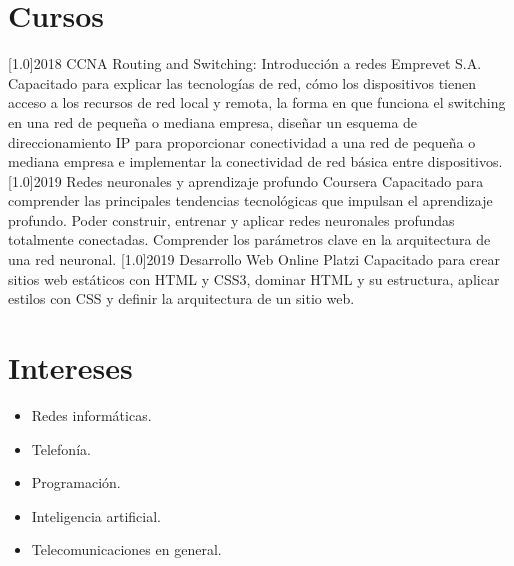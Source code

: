 \documentclass[espanol]{cv-style}     %
\begin{document}
\section{Cursos}
  \vspace{-0.2cm}
\begin{entrylist}
\entry
{\scalebox{.8}[1.0]{2018}}
{CCNA Routing and Switching: Introducción a redes}
{Emprevet S.A.}
{Capacitado para explicar las tecnologías de red, cómo los dispositivos tienen acceso a los recursos de red local y remota, la forma en que funciona el switching en una red de pequeña o mediana empresa, diseñar un esquema de direccionamiento IP para proporcionar conectividad a una red de pequeña o mediana empresa e implementar la conectividad de red básica entre dispositivos.}
\entry
{\scalebox{.8}[1.0]{2019}}
{Redes neuronales y aprendizaje profundo}
{Coursera}
{Capacitado para comprender las principales tendencias tecnológicas que impulsan el aprendizaje profundo. Poder construir, entrenar y aplicar redes neuronales profundas totalmente conectadas. Comprender los parámetros clave en la arquitectura de una red neuronal.}
\entry
{\scalebox{.8}[1.0]{2019}}
{Desarrollo Web Online}
{Platzi}
{Capacitado para crear sitios web estáticos con HTML y CSS3, dominar HTML y su estructura, aplicar estilos con CSS y definir la arquitectura de un sitio web.}



\end{entrylist}
  \vspace{-0.2cm}
\section{Intereses}
  \vspace{-0.2cm}
\begin{itemize}
    \item Redes informáticas.
    \item Telefonía.
    \item Programación.
    \item Inteligencia artificial.
    \item Telecomunicaciones en general.
\end{itemize}
\end{document}
